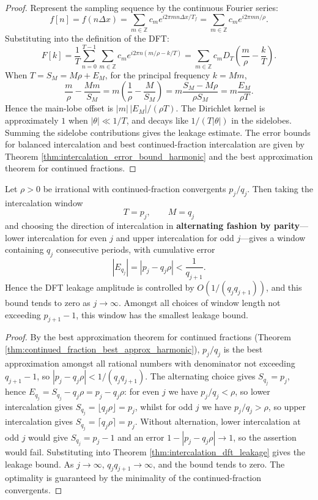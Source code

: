 \begin{proof}
Represent the sampling sequence by the continuous Fourier series:
\[
f[n]=f(n\Delta x)=\sum_{m\in\mathbb{Z}}c_m e^{i2\pi m n\Delta x/T_f}
=\sum_{m\in\mathbb{Z}}c_m e^{i2\pi m n/\rho}.
\]
Substituting into the definition of the DFT:
\[
F[k]=\frac{1}{T}\sum_{n=0}^{T-1}\sum_{m\in\mathbb{Z}}c_m
e^{i2\pi n(m/\rho-k/T)}
=\sum_{m\in\mathbb{Z}}c_m D_T\!\left(\frac{m}{\rho}-\frac{k}{T}\right).
\]
When \(T=S_M=M\rho+E_M\), for the principal frequency \(k=Mm\),
\[
\frac{m}{\rho}-\frac{Mm}{S_M}
=m\left(\frac{1}{\rho}-\frac{M}{S_M}\right)
=m\frac{S_M-M\rho}{\rho S_M}
=m\frac{E_M}{\rho T}.
\]
Hence the main-lobe offset is \(|m|\,|E_M|/(\rho T)\). The Dirichlet kernel is approximately \(1\) when \(|\theta|\ll 1/T\), and decays like \(1/(T|\theta|)\) in the sidelobes. Summing the sidelobe contributions gives the leakage estimate. The error bounds for balanced intercalation and best continued-fraction intercalation are given by Theorem \ref{thm:intercalation_error_bound_harmonic} and the best approximation theorem for continued fractions.
\end{proof}

\begin{corollary}\label{cor:continued_fraction_intercalation}
Let \(\rho>0\) be irrational with continued-fraction convergents \(p_j/q_j\). Then taking the intercalation window
\[
T=p_j,\qquad M=q_j
\]
and choosing the direction of intercalation in \textbf{alternating fashion by parity}---lower intercalation for even \(j\) and upper intercalation for odd \(j\)---gives a window containing \(q_j\) consecutive periods, with cumulative error
\[
|E_{q_j}|=|p_j-q_j\rho|<\frac{1}{q_{j+1}}.
\]
Hence the DFT leakage amplitude is controlled by \(O(1/(q_j q_{j+1}))\), and this bound tends to zero as $j\to\infty$. Amongst all choices of window length not exceeding $p_{j+1}-1$, this window has the smallest leakage bound.
\end{corollary}

\begin{proof}
By the best approximation theorem for continued fractions (Theorem \ref{thm:continued_fraction_best_approx_harmonic}), \(p_j/q_j\) is the best approximation amongst all rational numbers with denominator not exceeding \(q_{j+1}-1\), so \(|p_j-q_j\rho|<1/(q_j q_{j+1})\). The alternating choice gives \(S_{q_j}=p_j\), hence \(E_{q_j}=S_{q_j}-q_j\rho=p_j-q_j\rho\): for even \(j\) we have \(p_j/q_j<\rho\), so lower intercalation gives \(S_{q_j}=\lfloor q_j\rho\rfloor=p_j\), whilst for odd \(j\) we have \(p_j/q_j>\rho\), so upper intercalation gives \(S_{q_j}=\lceil q_j\rho\rceil=p_j\). Without alternation, lower intercalation at odd \(j\) would give \(S_{q_j}=p_j-1\) and an error \(1-|p_j-q_j\rho|\to1\), so the assertion would fail. Substituting into Theorem \ref{thm:intercalation_dft_leakage} gives the leakage bound. As $j\to\infty$, $q_jq_{j+1}\to\infty$, and the bound tends to zero. The optimality is guaranteed by the minimality of the continued-fraction convergents.
\end{proof}

